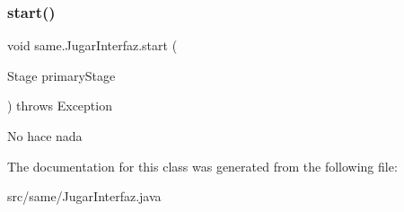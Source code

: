 \subsubsection{\texorpdfstring{start()}{start()}\hspace{0.1cm}{\footnotesize\ttfamily [2/2]}}
{\footnotesize\ttfamily void same.\+Jugar\+Interfaz.\+start (\begin{DoxyParamCaption}\item[{Stage}]{primary\+Stage }\end{DoxyParamCaption}) throws Exception}

No hace nada

The documentation for this class was generated from the following file\+:\begin{DoxyCompactItemize}
\item 
src/same/Jugar\+Interfaz.\+java\end{DoxyCompactItemize}
